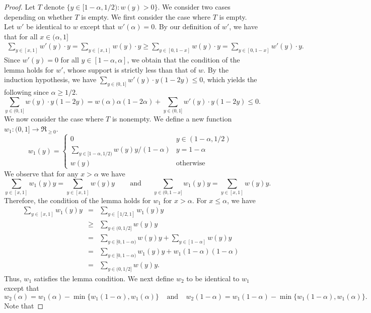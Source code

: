 \documentclass[11pt]{article}
\begin{document}
\begin{proof}
  Let $T$ denote $\{y \in [1-\alpha, 1/2): w(y) > 0\}$.  We consider
    two cases depending on whether $T$ is empty.  We first consider
    the case where $T$ is empty.  Let $w'$ be identical to $w$ except
    that $w'(\alpha) = 0$.  By our definition of $w'$, we have that
    for all $x \in (\alpha, 1]$
\begin{eqnarray*}
  \sum_{y \in [x,1]} w'(y) \cdot y = \sum_{y \in [x,1]} w(y) \cdot y \ge  
\sum_{y \in [0,1-x]} w(y) \cdot y =  
\sum_{y \in [0,1-x]} w'(y) \cdot y.
\end{eqnarray*}
Since $w'(y) = 0$ for all $y \in [1-\alpha,\alpha]$, we obtain that
the condition of the lemma holds for $w'$, whose support is strictly
less than that of $w$.  By the induction hypothesis, we have
$\sum_{y \in (0,1]} w'(y) \cdot y (1 - 2y) \le 0$,
which yields the following since $\alpha \ge 1/2$.
\[
\sum_{y \in (0,1]} w(y) \cdot y (1 - 2y) = w(\alpha) \alpha(1-2\alpha)
  + \sum_{y \in (0,1]} w'(y) \cdot y (1 - 2y) \le 0.
\]
We now consider the case where $T$ is nonempty.  We define a new
function $w_1: (0,1] \rightarrow \Re_{\ge 0}$.
  \[
  w_1(y) = \left\{
  \begin{array}{ll}
    0 & y \in (1 - \alpha, 1/2)\\
    \sum_{y \in [1-\alpha, 1/2)} w(y) y/(1-\alpha) & y = 1 - \alpha\\
    w(y) & \mbox{otherwise}
  \end{array}
  \right.
  \]
We observe that for any $x > \alpha$ we have \[\sum_{y \in [x,1]} w_1(y) y =
\sum_{y \in [x,1]} w(y) y \,\,\,\,\,\,\,\,\, \,\,\text{  and} \,\,\,\,\,\,\,\, \,\, \sum_{y \in (0,1-x]} w_1(y) y =
    \sum_{y \in [x,1]} w(y) y.\]  Therefore, the condition of the lemma
    holds for $w_1$ for $x > \alpha$.  For $x \le \alpha$, we have
\begin{eqnarray*}
  \sum_{y \in [x,1]} w_1(y) y & = & \sum_{y \in [1/2,1]} w_1(y) y\\
  & \ge & \sum_{y \in (0,1/2]} w(y) y\\
  & = & \sum_{y \in [0,1-\alpha)} w(y) y + \sum_{y \in [1-\alpha]} w(y) y\\
  & = & \sum_{y \in [0,1-\alpha)} w_1(y) y +  w_1(1-\alpha) (1 - \alpha)\\
  & = & \sum_{y \in (0,1/2]} w(y) y.
\end{eqnarray*}
Thus, $w_1$ satisfies the lemma condition.  We next define
$w_2$ to be identical to $w_1$ except that \[w_2(\alpha) = w_1(\alpha)
- \min\{w_1(1-\alpha), w_1(\alpha)\} \;\;\;\; \text{and} \;\;\;\; w_2(1-\alpha) =
w_1(1-\alpha) - \min\{w_1(1-\alpha), w_1(\alpha)\}.\]  Note that

\end{proof}
\end{document}
